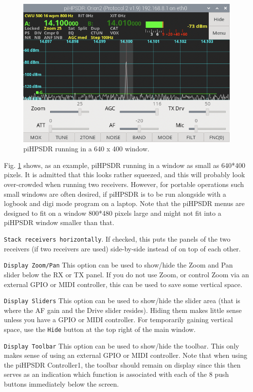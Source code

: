 \documentclass[12pt]{book}
\def\rett#1{\texttt{\color{red}#1}}
\def\pH{pi\-HPSDR\xspace}
\begin{document}
\begin{figure}[ht!]
\center
\includegraphics[scale=0.45]{640x400.png}
\caption{\pH running in a 640 x 400 window.}
\label{fig:640x400}
\end{figure}

Fig. \ref{fig:640x400} shows, as an example, \pH running in a window as small
as 640*400 pixels. It is admitted that this looks rather squeezed, and this
will probably look over-crowded when running two receivers. However, for
portable operations such small windows are often desired,
if \pH is to be run alongside with a logbook and digi mode program on a laptop.
Note that the \pH menus are designed to fit on a window 800*480 pixels large and might
not fit into a \pH window smaller than that.

\rett{Stack receivers horizontally}. If checked, this puts the panels
of the two receivers (if two receivers are used) side-by-side instead of on top
of each other.

\rett{Display Zoom/Pan} This option can be used to show/hide the Zoom and
Pan slider below the RX or TX panel. If you do not use Zoom, or control
Zoom via an external GPIO or MIDI controller, this can be used to save
some vertical space.

\rett{Display Sliders} This option can be used to show/hide the slider area
(that is where the AF gain and the Drive slider resides).
Hiding them makes little sense unless you
have a GPIO or MIDI controller. For temporarily gaining vertical space,
use the \rett{Hide} button at the top right of the main window.

\rett{Display Toolbar} This option can be used to show/hide the toolbar. This
only makes sense of using an external GPIO or MIDI controller. Note that
when using the \pH Controller1, the toolbar should remain on display since
this then serves as an indication which function is associated with each of
the 8 push buttons immediately below the screen.
\end{document}
